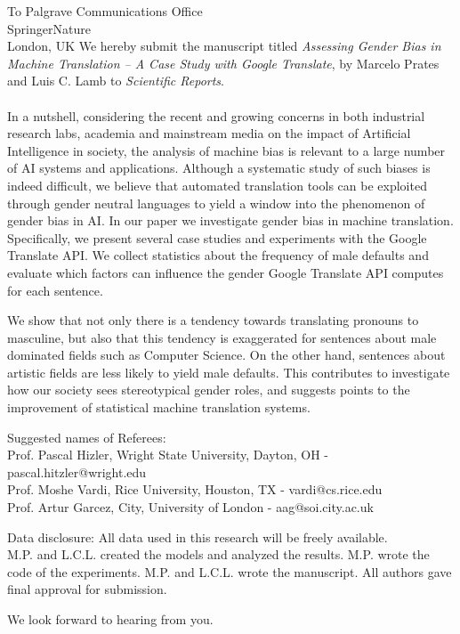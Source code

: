 \documentclass[10pt]{letter} %
\begin{document}
\begin{letter}{To Palgrave Communications Office\\
SpringerNature\\
London, UK
 }
We hereby submit the manuscript titled \emph{Assessing Gender Bias in Machine Translation -- A Case Study with Google Translate}, by Marcelo Prates and Luis C. Lamb to \emph{Scientific Reports}. \\
\\
In a nutshell, considering the recent and growing concerns in both industrial research labs,
academia and mainstream media on the impact of Artificial Intelligence in society, the analysis of  machine bias is relevant to a large number of AI systems and applications.  
Although a systematic study of such biases is indeed difficult, we believe that automated translation tools can be exploited through gender neutral languages to yield a window into the phenomenon of 
gender bias in AI.  
In our paper we investigate gender bias in machine translation. Specifically, we present several case studies and experiments with the Google Translate API. We collect statistics about the frequency of male defaults and evaluate which factors can influence the gender Google Translate API computes for each sentence. 

We show that not only there is a tendency towards translating pronouns to masculine, but also that this tendency is exaggerated for sentences about male dominated fields such as Computer Science. On the other hand, sentences about artistic fields are less likely to yield male defaults. This contributes to investigate how our society sees stereotypical gender roles, and suggests points to the improvement of   statistical machine translation systems. 

Suggested names of Referees: \\
Prof. Pascal Hizler, Wright State University, Dayton, OH -  pascal.hitzler@wright.edu \\
Prof. Moshe Vardi, Rice University, Houston, TX - vardi@cs.rice.edu\\
Prof. Artur Garcez, City, University of London - aag@soi.city.ac.uk

Data disclosure: All data used in this research will be freely available.\\
M.P. and L.C.L. created the models and analyzed the results. M.P. wrote the code
of the experiments.
M.P. and L.C.L. wrote the manuscript. All authors gave final approval for submission.

We look forward to hearing from you.\\ \ \\ \ \\ \ \\



\end{letter}
\end{document}
